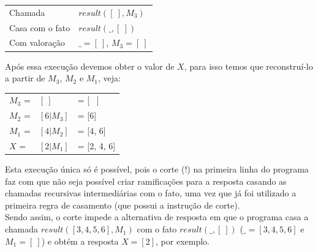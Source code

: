 \documentclass[12pt]{article}
\begin{document}
\begin{itemize}
\begin{itemize}
\begin{tabular}{ll}
						Chamada & $result([ \ ], M_3)$\\
						Casa com o fato & $result(\_, [ \ ])$\\
						Com valoração & $\_ = [ \ ]$, $M_3 = [ \ ]$\\
					\end{tabular}
					\hfill\newline
					Após essa execução devemos obter o valor de $X$, para isso
					temos que reconstruí-lo a partir de $M_3$, $M_2$ e $M_1$, veja:\\
					\begin{tabular}{lll}
						$M_3$ = & $[ \ ]      $ & = [ \ ]\\
						$M_2$ = & $[6|M_3]$ & = [6]\\
						$M_1$ = & $[4|M_2]$ & = [4, 6]\\
						$X$     = & $[2|M_1]$ & = [2, 4, 6]\\
					\end{tabular}
					\hfill\newline\newline
					Esta execução única só é possível, pois o corte (!) na primeira linha do
					programa faz com que não seja possível criar ramificações para a resposta
					casando as chamadas recursivas intermediárias com o fato, uma vez que já 
					foi utilizado a primeira regra de casamento 
					(que possui a instrução de corte).\\
					Sendo assim, o corte impede a alternativa de resposta em que o programa 
					casa 	a chamada $result([3, 4, 5, 6], M_1)$ com o fato $result(\_, [ \ ])$ 
					($\_ = [3, 4, 5, 6]$ e $M_1 = [ \ ]$) e obtém a resposta $X = [2]$, por 
					exemplo.
					
			\end{itemize}
	\end{itemize}
\end{document}
